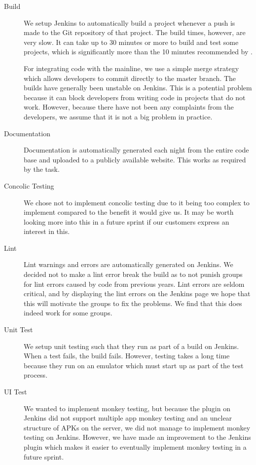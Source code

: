 \begin{description}
  \item[Build] We setup Jenkins to automatically build a project whenever a push is made to the Git repository of that project. The build times, however, are very slow. It can take up to 30 minutes or more to build and test some projects, which is significantly more than the 10 minutes recommended by \textcite{beck2004}.

  For integrating code with the mainline, we use a simple merge strategy which allows developers to commit directly to the master branch. The builds have generally been unstable on Jenkins. This is a potential problem because it can block developers from writing code in projects that do not work. However, because there have not been any complaints from the developers, we assume that it is not a big problem in practice.
  \item[Documentation] Documentation is automatically generated each night from the entire code base and uploaded to a publicly available website. This works as required by the task.
  \item[Concolic Testing] We chose not to implement concolic testing due to it being too complex to implement compared to the benefit it would give us. It may be worth looking more into this in a future sprint if our customers express an interest in this.
  \item[Lint] Lint warnings and errors are automatically generated on Jenkins. We decided not to make a lint error break the build as to not punish groups for lint errors caused by code from previous years. Lint errors are seldom critical, and by displaying the lint errors on the Jenkins page we hope that this will motivate the groups to fix the problems. We find that this does indeed work for some groups.
  \item[Unit Test] We setup unit testing such that they run as part of a build on Jenkins. When a test fails, the build fails. However, testing takes a long time because they run on an emulator which must start up as part of the test process.
  \item[UI Test] We wanted to implement monkey testing, but because the plugin on Jenkins did not support multiple app monkey testing and an unclear structure of APKs on the server, we did not manage to implement monkey testing on Jenkins. However, we have made an improvement to the Jenkins plugin which makes it easier to eventually implement monkey testing in a future sprint.
\end{description}

